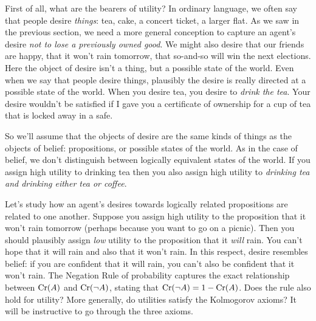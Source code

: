 First of all, what are the bearers of utility? In ordinary language, we often
say that people desire \emph{things}: tea, cake, a concert ticket, a larger
flat. As we saw in the previous section, we need a more general conception to
capture an agent's desire \emph{not to lose a previously owned good}. We might
also desire that our friends are happy, that it won't rain tomorrow, that
so-and-so will win the next elections. Here the object of desire isn't a thing,
but a possible state of the world. Even when we say that people desire things,
plausibly the desire is really directed at a possible state of the world. When
you desire tea, you desire to \emph{drink the tea}. Your desire wouldn't be
satisfied if I gave you a certificate of ownership for a cup of tea that is
locked away in a safe.

So we'll assume that the objects of desire are the same kinds of things as the
objects of belief: propositions, or possible states of the world. As in the case
of belief, we don't distinguish between logically equivalent states of the
world. If you assign high utility to drinking tea then you also assign high
utility to \emph{drinking tea and drinking either tea or coffee}.


Let's study how an agent's desires towards logically related propositions are
related to one another. Suppose you assign high utility to the proposition that
it won't rain tomorrow (perhaps because you want to go on a picnic). Then you
should plausibly assign \emph{low} utility to the proposition that it
\emph{will} rain. You can't hope that it will rain and also that it won't rain.
In this respect, desire resembles belief: if you are confident that it will
rain, you can't also be confident that it won't rain. The Negation Rule of
probability captures the exact relationship between $\text{Cr}(A)$ and $\text{Cr}(\neg A)$,
stating that $\text{Cr}(\neg A) = 1 - \text{Cr}(A)$. Does the rule also hold for utility?
More generally, do utilities satisfy the Kolmogorov axioms? It will be
instructive to go through the three axioms.

